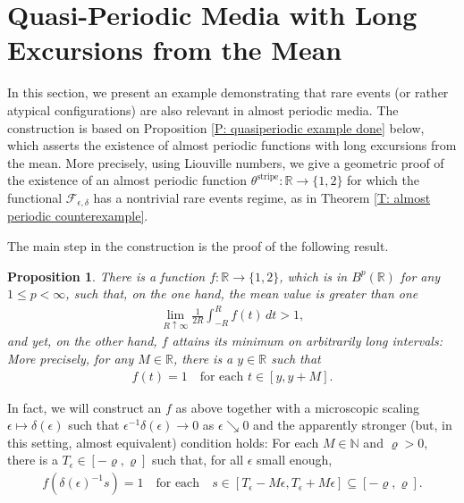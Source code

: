 \documentclass[12pt]{amsart}
\newtheorem{prop}{Proposition}
\begin{document}

\section{Quasi-Periodic Media with Long Excursions from the Mean} \label{S: quasiperiodic examples}

In this section, we present an example demonstrating that rare events (or rather atypical configurations) are also relevant in almost periodic media.  The construction is based on Proposition \ref{P: quasiperiodic example done} below, which asserts the existence of almost periodic functions with long excursions from the mean.  More precisely, using Liouville numbers, we give a geometric proof of the existence of an almost periodic function $\theta^{\text{stripe}} : \mathbb{R} \to \{1,2\}$ for which the functional $\mathscr{F}_{\epsilon,\delta}$ has a nontrivial rare events regime, as in Theorem \ref{T: almost periodic counterexample}.

The main step in the construction is the proof of the following result.

	\begin{prop} \label{P: quasiperiodic construction} There is a function $f : \mathbb{R} \to \{1,2\}$, which is in $B^{p}(\mathbb{R})$ for any $1 \leq p < \infty$, such that, on the one hand, the mean value is greater than one
		\begin{align*}
			\lim_{ R \uparrow \infty } \frac{1}{2R} \int_{-R}^{R} f(t) \, dt > 1,
		\end{align*}
	and yet, on the other hand, $f$ attains its minimum on arbitrarily long intervals: More precisely, for any $M \in \mathbb{R}$, there is a $y \in \mathbb{R}$ such that 
		\begin{align} \label{E: weaker condition}
			f(t) = 1 \quad \text{for each} \, \, t \in [y,y+M].
		\end{align}
	\end{prop}

In fact, we will construct an $f$ as above together with a microscopic scaling $\epsilon \mapsto \delta(\epsilon)$ such that $\epsilon^{-1} \delta(\epsilon) \to 0$ as $\epsilon \searrow 0$ and the apparently stronger (but, in this setting, almost equivalent) condition holds: For each $M \in \mathbb{N}$ and $\varrho > 0$, there is a $T_{\epsilon} \in [-\varrho,\varrho]$ such that, for all $\epsilon$ small enough,
	\begin{align} \label{E: condition we need later}
		f(\delta(\epsilon)^{-1}s) = 1 \quad \text{for each} \quad s \in [T_{\epsilon} - M \epsilon,T_{\epsilon} + M \epsilon] \subseteq [-\varrho,\varrho].
	\end{align}
	
\end{document}
